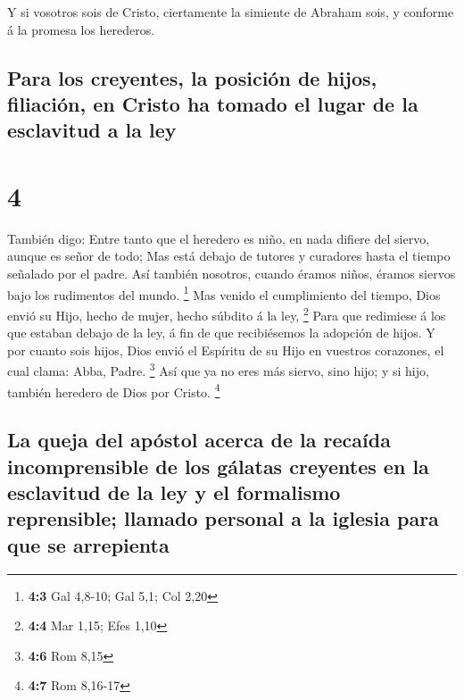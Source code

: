  Y si vosotros sois de Cristo, ciertamente la simiente de
Abraham sois, y conforme á la promesa los herederos.

\hypertarget{para-los-creyentes-la-posiciuxf3n-de-hijos-filiaciuxf3n-en-cristo-ha-tomado-el-lugar-de-la-esclavitud-a-la-ley}{%
\subsection{Para los creyentes, la posición de hijos, filiación, en
Cristo ha tomado el lugar de la esclavitud a la
ley}\label{para-los-creyentes-la-posiciuxf3n-de-hijos-filiaciuxf3n-en-cristo-ha-tomado-el-lugar-de-la-esclavitud-a-la-ley}}

\hypertarget{section-3}{%
\section{4}\label{section-3}}

 También digo: Entre tanto que el heredero es niño, en nada
difiere del siervo, aunque es señor de todo;  Mas está
debajo de tutores y curadores hasta el tiempo señalado por el padre.
 Así también nosotros, cuando éramos niños, éramos siervos
bajo los rudimentos del mundo. \footnote{\textbf{4:3} Gal 4,8-10; Gal
  5,1; Col 2,20}  Mas venido el cumplimiento del tiempo,
Dios envió su Hijo, hecho de mujer, hecho súbdito á la ley, \footnote{\textbf{4:4}
  Mar 1,15; Efes 1,10}  Para que redimiese á los que estaban
debajo de la ley, á fin de que recibiésemos la adopción de hijos.
 Y por cuanto sois hijos, Dios envió el Espíritu de su Hijo
en vuestros corazones, el cual clama: Abba, Padre. \footnote{\textbf{4:6}
  Rom 8,15}  Así que ya no eres más siervo, sino hijo; y si
hijo, también heredero de Dios por Cristo. \footnote{\textbf{4:7} Rom
  8,16-17}

\hypertarget{la-queja-del-apuxf3stol-acerca-de-la-recauxedda-incomprensible-de-los-guxe1latas-creyentes-en-la-esclavitud-de-la-ley-y-el-formalismo-reprensible-llamado-personal-a-la-iglesia-para-que-se-arrepienta}{%
\subsection{La queja del apóstol acerca de la recaída incomprensible de
los gálatas creyentes en la esclavitud de la ley y el formalismo
reprensible; llamado personal a la iglesia para que se
arrepienta}\label{la-queja-del-apuxf3stol-acerca-de-la-recauxedda-incomprensible-de-los-guxe1latas-creyentes-en-la-esclavitud-de-la-ley-y-el-formalismo-reprensible-llamado-personal-a-la-iglesia-para-que-se-arrepienta}}

